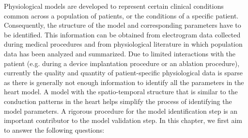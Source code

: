 Physiological models are developed to represent certain clinical conditions common across a population of patients, or the conditions of a specific patient. Consequently, the structure of the model and corresponding parameters have to be identified. This information can be obtained from electrogram data collected during medical procedures and from physiological literature in which population data has been analyzed and summarized. Due to limited interactions with the patient (e.g. during a device implantation procedure or an ablation procedure), currently the quality and quantity of patient-specific physiological data is sparse as there is generally not enough information to identify all the parameters in the heart model.  A model with the spatio-temporal structure that is similar to the conduction patterns in the heart helps simplify the process of identifying the model parameters. A rigorous procedure for the model identification step is an important contributor to the model validation step. In this chapter, we first aim to answer the following questions:


